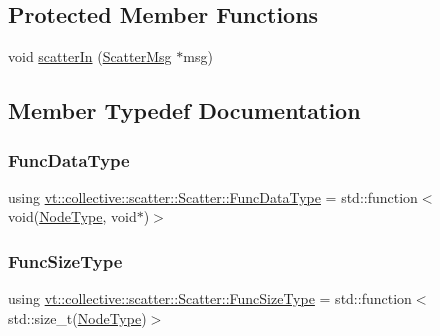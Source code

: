 \subsection*{Protected Member Functions}
\begin{DoxyCompactItemize}
\item 
void \hyperlink{structvt_1_1collective_1_1scatter_1_1_scatter_aa80a957377cce3126058f3d7d30d2fed}{scatter\+In} (\hyperlink{structvt_1_1collective_1_1scatter_1_1_scatter_msg}{Scatter\+Msg} $\ast$msg)
\end{DoxyCompactItemize}


\subsection{Member Typedef Documentation}
\mbox{\label{structvt_1_1collective_1_1scatter_1_1_scatter_a4040244e8ed36afd5d408c27efceea1b}} 
\subsubsection{\texorpdfstring{Func\+Data\+Type}{FuncDataType}}
{\footnotesize\ttfamily using \hyperlink{structvt_1_1collective_1_1scatter_1_1_scatter_a4040244e8ed36afd5d408c27efceea1b}{vt\+::collective\+::scatter\+::\+Scatter\+::\+Func\+Data\+Type} =  std\+::function$<$void(\hyperlink{namespacevt_a866da9d0efc19c0a1ce79e9e492f47e2}{Node\+Type}, void$\ast$)$>$}

\mbox{\label{structvt_1_1collective_1_1scatter_1_1_scatter_a977d895e42999a4078c6705ac851f447}} 
\subsubsection{\texorpdfstring{Func\+Size\+Type}{FuncSizeType}}
{\footnotesize\ttfamily using \hyperlink{structvt_1_1collective_1_1scatter_1_1_scatter_a977d895e42999a4078c6705ac851f447}{vt\+::collective\+::scatter\+::\+Scatter\+::\+Func\+Size\+Type} =  std\+::function$<$std\+::size\+\_\+t(\hyperlink{namespacevt_a866da9d0efc19c0a1ce79e9e492f47e2}{Node\+Type})$>$}



